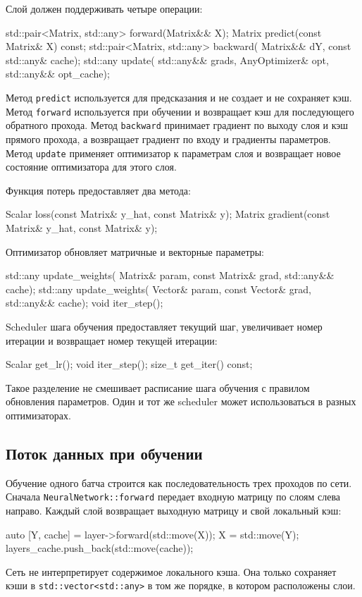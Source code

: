 \documentclass{article}
\begin{document}
Слой должен поддерживать четыре операции:
\begin{cppcode}
std::pair<Matrix, std::any> forward(Matrix&& X);
Matrix predict(const Matrix& X) const;
std::pair<Matrix, std::any> backward(
    Matrix&& dY,
    const std::any& cache);
std::any update(
    std::any&& grads,
    AnyOptimizer& opt,
    std::any&& opt_cache);
\end{cppcode}
Метод \texttt{predict} используется для предсказания и не создает и не сохраняет кэш.
Метод \texttt{forward} используется при обучении и возвращает кэш для
последующего обратного прохода. Метод \texttt{backward} принимает
градиент по выходу слоя и кэш прямого прохода, а возвращает градиент
по входу и градиенты параметров. Метод \texttt{update} применяет
оптимизатор к параметрам слоя и возвращает новое состояние
оптимизатора для этого слоя.

Функция потерь предоставляет два метода:
\begin{cppcode}
Scalar loss(const Matrix& y_hat, const Matrix& y);
Matrix gradient(const Matrix& y_hat, const Matrix& y);
\end{cppcode}
\newpage
Оптимизатор обновляет матричные и векторные параметры:
\begin{cppcode}
std::any update_weights(
    Matrix& param,
    const Matrix& grad,
    std::any&& cache);
std::any update_weights(
    Vector& param,
    const Vector& grad,
    std::any&& cache);
void iter_step();
\end{cppcode}
Scheduler шага обучения предоставляет текущий шаг, увеличивает номер
итерации и возвращает номер текущей итерации:
\begin{cppcode}
Scalar get_lr();
void iter_step();
size_t get_iter() const;
\end{cppcode}
Такое разделение не смешивает расписание шага обучения с правилом
обновления параметров. Один и тот же scheduler может использоваться в
разных оптимизаторах.

\subsection{Поток данных при обучении}

Обучение одного батча строится как последовательность трех проходов по
сети. Сначала \texttt{NeuralNetwork::forward} передает входную матрицу
по слоям слева направо. Каждый слой возвращает выходную матрицу и свой
локальный кэш:
\begin{cppcode}
auto [Y, cache] = layer->forward(std::move(X));
X = std::move(Y);
layers_cache.push_back(std::move(cache));
\end{cppcode}
Сеть не интерпретирует содержимое локального кэша. Она только
сохраняет кэши в \texttt{std::vector<std::any>} в том же порядке, в
котором расположены слои.
\end{document}
